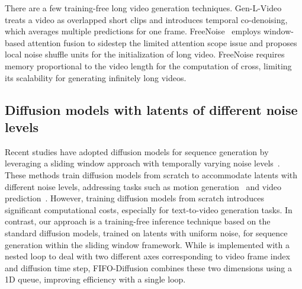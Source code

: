There are a few training-free long video generation techniques.
Gen-L-Video~\citep{wang2023genl} treats a video as overlapped short clips and introduces temporal co-denoising, which averages multiple predictions for one frame.
FreeNoise~\citep{qiu2023freenoise} employs window-based attention fusion to sidestep the limited attention scope issue and proposes local noise shuffle units for the initialization of long video.
FreeNoise requires memory proportional to the video length for the computation of cross, limiting its scalability for generating infinitely long videos.

\subsection{Diffusion models with latents of different noise levels}
Recent studies have adopted diffusion models for sequence generation by leveraging a sliding window approach with temporally varying noise levels~\citep{zhang2024tedi,ruhe2024rolling}.
These methods train diffusion models from scratch to accommodate latents with different noise levels, addressing tasks such as motion generation~\citep{zhang2024tedi} and video prediction~\citep{ruhe2024rolling}. 
However, training diffusion models from scratch introduces significant computational costs, especially for text-to-video generation tasks. 
In contrast, our approach is a training-free inference technique based on the standard diffusion models, trained on latents with uniform noise, for sequence generation within the sliding window framework. 
While \citep{ruhe2024rolling} is implemented with a nested loop to deal with two different axes corresponding to video frame index and diffusion time step, FIFO-Diffusion combines these two dimensions using a 1D queue, improving efficiency with a single loop.
